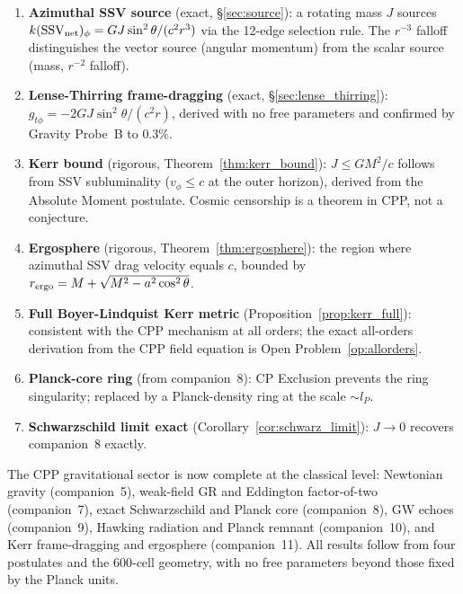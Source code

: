 \documentclass[12pt]{article}
\newcommand{\lP}{l_P}
\newcommand{\SSV}{\mathrm{SSV}}
\begin{document}
\begin{enumerate}
  \item \textbf{Azimuthal SSV source} (exact, §\ref{sec:source}):
    a rotating mass $J$ sources $k(\SSV_{\rm net})_\phi =
    GJ\sin^2\theta/(c^2 r^3)$ via the 12-edge selection rule.
    The $r^{-3}$ falloff distinguishes the vector source (angular
    momentum) from the scalar source (mass, $r^{-2}$ falloff).

  \item \textbf{Lense-Thirring frame-dragging} (exact, §\ref{sec:lense_thirring}):
    $g_{t\phi} = -2GJ\sin^2\theta/(c^2 r)$, derived with no free
    parameters and confirmed by Gravity Probe~B to $0.3\%$.

  \item \textbf{Kerr bound} (rigorous, Theorem~\ref{thm:kerr_bound}):
    $J \leq GM^2/c$ follows from SSV subluminality ($v_\phi \leq c$
    at the outer horizon), derived from the Absolute Moment postulate.
    Cosmic censorship is a theorem in CPP, not a conjecture.

  \item \textbf{Ergosphere} (rigorous, Theorem~\ref{thm:ergosphere}):
    the region where azimuthal SSV drag velocity equals $c$, bounded
    by $r_{\rm ergo} = M + \sqrt{M^2 - a^2\cos^2\theta}$.

  \item \textbf{Full Boyer-Lindquist Kerr metric}
    (Proposition~\ref{prop:kerr_full}): consistent with the CPP
    mechanism at all orders; the exact all-orders derivation from the
    CPP field equation is Open Problem~\ref{op:allorders}.

  \item \textbf{Planck-core ring} (from companion~8): CP Exclusion
    prevents the ring singularity; replaced by a Planck-density ring
    at the scale $\sim \lP$.

  \item \textbf{Schwarzschild limit exact} (Corollary~\ref{cor:schwarz_limit}):
    $J \to 0$ recovers companion~8 exactly.
\end{enumerate}

The CPP gravitational sector is now complete at the classical level:
Newtonian gravity (companion~5), weak-field GR and Eddington
factor-of-two (companion~7), exact Schwarzschild and Planck core
(companion~8), GW echoes (companion~9), Hawking radiation and Planck
remnant (companion~10), and Kerr frame-dragging and ergosphere
(companion~11).  All results follow from four postulates and the
600-cell geometry, with no free parameters beyond those fixed by the
Planck units.
\end{document}
